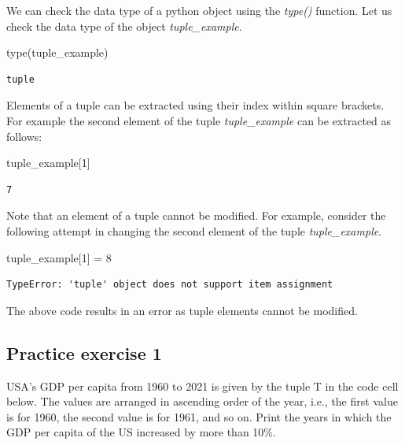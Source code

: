 \documentclass[
  letterpaper,
  DIV=11,
  numbers=noendperiod]{scrreprt}
\newenvironment{Shaded}{\begin{snugshade}}{\end{snugshade}}
\newcommand{\BuiltInTok}[1]{\textcolor[rgb]{0.00,0.23,0.31}{#1}}
\newcommand{\DecValTok}[1]{\textcolor[rgb]{0.68,0.00,0.00}{#1}}
\newcommand{\NormalTok}[1]{\textcolor[rgb]{0.00,0.23,0.31}{#1}}
\newcommand{\OperatorTok}[1]{\textcolor[rgb]{0.37,0.37,0.37}{#1}}
\begin{document}
We can check the data type of a python object using the \emph{type()}
function. Let us check the data type of the object
\emph{tuple\_example}.

\begin{Shaded}
\begin{Highlighting}[]
\BuiltInTok{type}\NormalTok{(tuple\_example)}
\end{Highlighting}
\end{Shaded}

\begin{verbatim}
tuple
\end{verbatim}

Elements of a tuple can be extracted using their index within square
brackets. For example the second element of the tuple
\emph{tuple\_example} can be extracted as follows:

\begin{Shaded}
\begin{Highlighting}[]
\NormalTok{tuple\_example[}\DecValTok{1}\NormalTok{]}
\end{Highlighting}
\end{Shaded}

\begin{verbatim}
7
\end{verbatim}

Note that an element of a tuple cannot be modified. For example,
consider the following attempt in changing the second element of the
tuple \emph{tuple\_example}.

\begin{Shaded}
\begin{Highlighting}[]
\NormalTok{tuple\_example[}\DecValTok{1}\NormalTok{] }\OperatorTok{=} \DecValTok{8}
\end{Highlighting}
\end{Shaded}

\begin{verbatim}
TypeError: 'tuple' object does not support item assignment
\end{verbatim}

The above code results in an error as tuple elements cannot be modified.

\hypertarget{practice-exercise-1-3}{%
\subsection{Practice exercise 1}\label{practice-exercise-1-3}}

USA's GDP per capita from 1960 to 2021 is given by the tuple T in the
code cell below. The values are arranged in ascending order of the year,
i.e., the first value is for 1960, the second value is for 1961, and so
on. Print the years in which the GDP per capita of the US increased by
more than 10\%.
\end{document}
